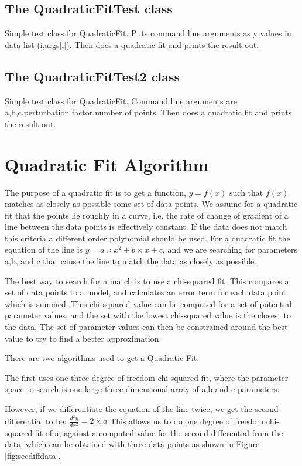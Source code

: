 \documentclass[10pt,a4paper]{article}
\begin{document}
\subsection{The QuadraticFitTest class}
Simple test class for QuadraticFit. Puts command line arguments as y values in data list (i,args[i]). 
Then does a quadratic fit and prints the result out. 

\subsection{The QuadraticFitTest2 class}
Simple test class for QuadraticFit. Command line arguments are a,b,c,perturbation factor,number of points. 
Then does a quadratic fit and prints the result out. 

\section{Quadratic Fit Algorithm}
The purpose of a quadratic fit is to get a function, $y = f(x)$ such that $f(x)$ matches as closely as possible
some set of data points. We assume for a quadratic fit that the points lie roughly in a curve, i.e. the
rate of change of gradient of a line between the data points is effectively constant. If the data does not match
this criteria a different order polynomial should be used. For a quadratic fit the equation of the line
is $y = a \times x^2 + b \times x + c$, and we are searching for parameters a,b, and c that cause the line to
match the data as closely as possible.

The best way to search for a match is to use a chi-squared fit. This compares a set of data points
to a model, and calculates an error term for each data point which is summed. This chi-squared value can
be computed for a set of potential parameter values, and the set with the lowest chi-squared value is the
closest to the data. The set of parameter values can then be constrained around the best value to try
to find a better approximation.

There are two algorithms used to get a Quadratic Fit. 

The first uses one three degree of freedom
chi-squared fit, where the parameter space to search is one large three dimensional array of a,b and c parameters.

However, if we differentiate the equation of the line twice, we get the second differential to be:
\newline
\begin{math}
\frac{d^2y}{dx^2} = 2 \times a
\end{math}
\newline
This allows us to do one degree of freedom chi-squared fit of a, against a computed
value for the second differential from the data, which can be obtained with three data points as shown in
Figure \ref{fig:secdiffdata}.
\end{document}
